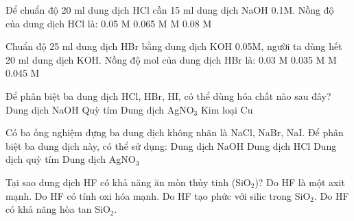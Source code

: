 \documentclass[Main.tex]{subfiles}
\begin{document}
    \begin{ex}
    Để chuẩn độ 20 ml dung dịch HCl cần 15 ml dung dịch NaOH 0.1M. Nồng độ của dung dịch HCl là:
    \choice
    {0.05 M}
    {0.065 M}
    { M}
    {0.08 M}
    \end{ex}
    
    \begin{ex}
    Chuẩn độ 25 ml dung dịch HBr bằng dung dịch KOH 0.05M, người ta dùng hết 20 ml dung dịch KOH. Nồng độ mol của dung dịch HBr là:
    \choice
    {0.03 M}
    {0.035 M}
    { M}
    {0.045 M}
    \end{ex}
    
    \begin{ex}
    Để phân biệt ba dung dịch HCl, HBr, HI, có thể dùng hóa chất nào sau đây?
    \choice
    {Dung dịch NaOH}
    {Quỳ tím}
    {\True Dung dịch AgNO$_3$}
    {Kim loại Cu}
    \end{ex}
    
    \begin{ex}
    Có ba ống nghiệm đựng ba dung dịch không nhãn là NaCl, NaBr, NaI. Để phân biệt ba dung dịch này, có thể sử dụng:
    \choice
    {Dung dịch NaOH}
    {Dung dịch HCl}
    {Dung dịch quỳ tím}
    {\True Dung dịch AgNO$_3$}
    \end{ex}
    
    \begin{ex}
    Tại sao dung dịch HF có khả năng ăn mòn thủy tinh (SiO$_2$)?
    \choice
    {Do HF là một axit mạnh.}
    {Do HF có tính oxi hóa mạnh.}
    {\True Do HF tạo phức với silic trong SiO$_2$.}
    {Do HF có khả năng hòa tan SiO$_2$.}
    \end{ex}
    
\end{document}
